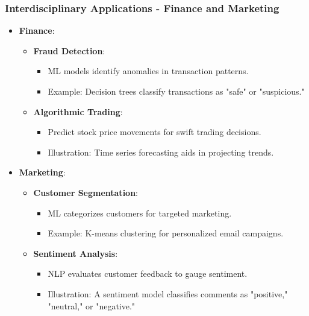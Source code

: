 \documentclass[aspectratio=169]{beamer}
\begin{document}
\begin{frame}[fragile]
    \frametitle{Interdisciplinary Applications - Finance and Marketing}
    \begin{itemize}
        \item \textbf{Finance}:
            \begin{itemize}
                \item \textbf{Fraud Detection}:
                    \begin{itemize}
                        \item ML models identify anomalies in transaction patterns.
                        \item Example: Decision trees classify transactions as "safe" or "suspicious."
                    \end{itemize}
                \item \textbf{Algorithmic Trading}:
                    \begin{itemize}
                        \item Predict stock price movements for swift trading decisions.
                        \item Illustration: Time series forecasting aids in projecting trends.
                    \end{itemize}
            \end{itemize}
        
        \item \textbf{Marketing}:
            \begin{itemize}
                \item \textbf{Customer Segmentation}:
                    \begin{itemize}
                        \item ML categorizes customers for targeted marketing.
                        \item Example: K-means clustering for personalized email campaigns.
                    \end{itemize}
                \item \textbf{Sentiment Analysis}:
                    \begin{itemize}
                        \item NLP evaluates customer feedback to gauge sentiment.
                        \item Illustration: A sentiment model classifies comments as "positive," "neutral," or "negative."
                    \end{itemize}
            \end{itemize}
    \end{itemize}
\end{frame}
\end{document}

